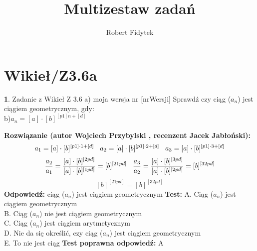 \documentclass[12pt, a4paper]{article}
\title{Multizestaw zadań}
\author{Robert Fidytek}
\date{}
\theoremstyle{definition} %
\newtheorem{zad}{}
\newcommand{\kategoria}[1]{\section{#1}} %
\newcommand{\zadStart}[1]{\begin{zad}#1\newline} %
\newcommand{\zadStop}{\end{zad}}   %
\newcommand{\rozwStart}[2]{\noindent \textbf{Rozwiązanie (autor #1 , recenzent #2): }\newline} %
\newcommand{\rozwStop}{\newline}                                            %
\newcommand{\odpStart}{\noindent \textbf{Odpowiedź:}\newline}    %
\newcommand{\odpStop}{\newline}                                             %
\newcommand{\testStart}{\noindent \textbf{Test:}\newline} %
\newcommand{\testStop}{\newline} %
\newcommand{\kluczStart}{\noindent \textbf{Test poprawna odpowiedź:}\newline} %
\newcommand{\kluczStop}{\newline} %
\begin{document}
\maketitle


\kategoria{Wikieł/Z3.6a}
\zadStart{Zadanie z Wikieł Z 3.6 a) moja wersja nr [nrWersji]}
Sprawdź czy ciąg ($a_{n}$) jest ciągiem geometrycznym, gdy:\\
b)$a_{n}=[a]\cdot[b]^{[p1]n+[d]}$
\zadStop
\rozwStart{Wojciech Przybylski}{Jacek Jabłoński}
$$a_{1}=[a]\cdot[b]^{[p1]\cdot1+[d]}\hspace{3mm}a_{2}=[a]\cdot[b]^{[p1]\cdot2+[d]}\hspace{3mm}a_{3}=[a]\cdot[b]^{[p1]\cdot3+[d]} $$
$$\frac{a_{2}}{a_{1}}=\frac{[a]\cdot[b]^{[2pd]}}{[a]\cdot[b]^{[1pd]}}=[b]^{[21pd]}  \hspace{3mm} \frac{a_{3}}{a_{2}}=\frac{[a]\cdot[b]^{[3pd]}}{[a]\cdot[b]^{[2pd]}}=[b]^{[32pd]}  $$
$$[b]^{[21pd]}=[b]^{[32pd]} $$ 
\rozwStop
\odpStart
ciąg ($a_{n}$) jest ciągiem geometrycznym
\odpStop
\testStart
A. Ciąg ($a_{n}$) jest ciągiem geometrycznym\\
B. Ciąg ($a_{n}$) nie jest ciągiem geometrycznym\\
C. Ciąg ($a_{n}$) jest ciągiem arytmetycznym\\
D. Nie da się określić, czy ciąg ($a_{n}$) jest ciągiem geometrycznym\\
E. To nie jest ciąg
\testStop
\kluczStart
A
\kluczStop
\end{document}
